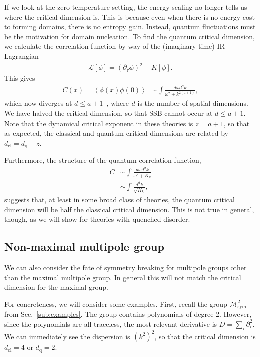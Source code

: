 \documentclass[pra,aps,twocolumn, amsfonts,amsmath,amssymb,nofootinbib,superscriptaddress]{revtex4-2}
\newcommand{\nn}{\nonumber\\}
\newcommand{\cl}{\text{cl}}
\newcommand{\q}{\text{q}}
\begin{document}
If we look at the zero temperature setting, the energy scaling no longer tells us where the critical dimension is. This is because even when there is no energy cost to forming domains, there is no entropy gain. Instead, quantum fluctuations must be the motivation for domain nucleation. To find the quantum critical dimension, we calculate the correlation function by way of the (imaginary-time) IR Lagrangian 
\begin{align}
     \mathcal{L}[\phi] = (\partial_\tau\phi)^2 + K[\phi].
\end{align} 
This gives 
\begin{align}
\label{tzerocorr}C(x) = \left\langle \phi(x) \phi(0) \right\rangle &\sim \int \frac{d\omega d^dk}{\omega^2 + k^{2( a + 1 )}},
\end{align}
which now diverges at $d\le a+1$~\cite{Griffin2015}, where $d$ is the number of spatial dimensions. We have halved the critical dimension, so that SSB cannot occur at $d\le a+1$. Note that the dynamical critical exponent in these theories is $z = a+1$, so that as expected, the classical and quantum critical dimensions are related by $d_\text{cl} = d_\text{q} + z$.

Furthermore, the structure of the quantum correlation function,
\begin{align}
C &\sim \int \frac{d\omega d^dk}{\omega^2 + K_k}\nn
&\sim \int \frac{d^dk}{\sqrt{K_k}},
\end{align}
suggests that, at least in some broad class of theories, the quantum critical dimension will be half the classical critical dimension. This is not true in general, though, as we will show for theories with quenched disorder.

\subsection{Non-maximal multipole group} \label{sub:nonmax}

We can also consider the fate of symmetry breaking for multipole groups other than the maximal multipole group. In general this will not match the critical dimension for the maximal group. 

For concreteness, we will consider some examples. First, recall the group $\mathcal{M}^2_\text{sym}$ from Sec.~\ref{sub:examples}. The group contains polynomials of degree 2. However, since the polynomials are all traceless, the most relevant derivative is $D = \sum_i \partial^2_i$.  We can immediately see the dispersion is $(k^2)^2$, so that the critical dimension is $d_\cl = 4$ or $d_\q = 2$.
\end{document}
